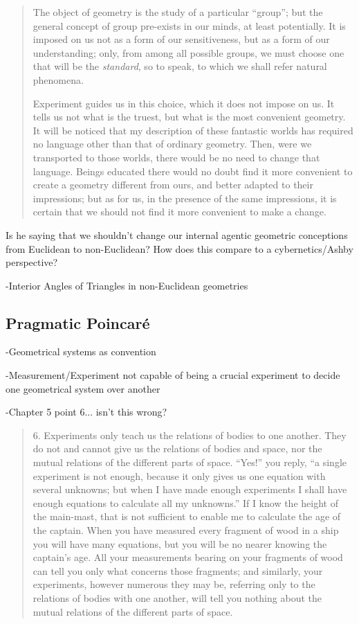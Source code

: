 \begin{quote}
    The object of geometry is the study of a particular ``group''; but the general concept of group pre-exists in our minds, at least potentially.  It is imposed on us not as a form of our sensitiveness, but as a form of our understanding; only, from among all possible groups, we must choose one that will be the \emph{standard}, so to speak, to which we shall refer natural phenomena.
    
    Experiment guides us in this choice, which it does not impose on us.  It tells us not what is the truest, but what is the most convenient geometry.  It will be noticed that my description of these fantastic worlds has required no language other than that of ordinary geometry.  Then, were we transported to those worlds, there would be no need to change that language.  Beings educated there would no doubt find it more convenient to create a geometry different from ours, and better adapted to their impressions; but as for us, in the presence of the same impressions, it is certain that we should not find it more convenient to make a change.
    
    \citep[p. 70-71]{Poincare1952}
\end{quote}

Is he saying that we shouldn't change our internal agentic geometric conceptions from Euclidean to non-Euclidean?  How does this compare to a cybernetics/Ashby perspective?

-Interior Angles of Triangles in non-Euclidean geometries

\subsection{Pragmatic Poincar\'e}

-Geometrical systems as convention

-Measurement/Experiment not capable of being a crucial experiment to decide one geometrical system over another

-Chapter 5 point 6... isn't this wrong?

\begin{quote}
    6.  Experiments only teach us the relations of bodies to one another.  They do not and cannot give us the relations of bodies and space, nor the mutual relations of the different parts of space.  ``Yes!'' you reply, ``a single experiment is not enough, because it only gives us one equation with several unknowns; but when I have made enough experiments I shall have enough equations to calculate all my unknowns.''  If I know the height of the main-mast, that is not sufficient to enable me to calculate the age of the captain.  When you have measured every fragment of wood in a ship you will have many equations, but you will be no nearer knowing the captain's age.  All your measurements bearing on your fragments of wood can tell you only what concerns those fragments; and similarly, your experiments, however numerous they may be, referring only to the relations of bodies with one another, will tell you nothing about the mutual relations of the different parts of space.
    
    \citep[p. 79-80]{Poincare1952}
\end{quote}

